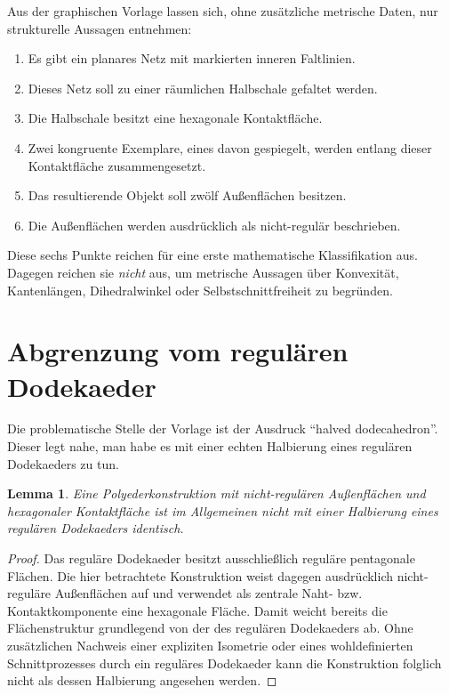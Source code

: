 \documentclass[11pt]{article}
\theoremstyle{plain}
\newtheorem{lemma}[satz]{Lemma}
\theoremstyle{definition}
\theoremstyle{remark}
\begin{document}
	Aus der graphischen Vorlage lassen sich, ohne zusätzliche metrische Daten, nur strukturelle Aussagen entnehmen:
	\begin{enumerate}[label=(\roman*)]
		\item Es gibt ein planares Netz mit markierten inneren Faltlinien.
		\item Dieses Netz soll zu einer räumlichen Halbschale gefaltet werden.
		\item Die Halbschale besitzt eine hexagonale Kontaktfläche.
		\item Zwei kongruente Exemplare, eines davon gespiegelt, werden entlang dieser Kontaktfläche zusammengesetzt.
		\item Das resultierende Objekt soll zwölf Außenflächen besitzen.
		\item Die Außenflächen werden ausdrücklich als nicht-regulär beschrieben.
	\end{enumerate}
	
	Diese sechs Punkte reichen für eine erste mathematische Klassifikation aus. Dagegen reichen sie \emph{nicht} aus, um metrische Aussagen über Konvexität, Kantenlängen, Dihedralwinkel oder Selbstschnittfreiheit zu begründen.
	
	\section{Abgrenzung vom regulären Dodekaeder}
	
	Die problematische Stelle der Vorlage ist der Ausdruck \enquote{halved dodecahedron}. Dieser legt nahe, man habe es mit einer echten Halbierung eines regulären Dodekaeders zu tun.
	
	\begin{lemma}\label{lem:nicht-halbdodekaeder}
		Eine Polyederkonstruktion mit nicht-regulären Außenflächen und hexagonaler Kontaktfläche ist im Allgemeinen nicht mit einer Halbierung eines regulären Dodekaeders identisch.
	\end{lemma}
	
	\begin{proof}
		Das reguläre Dodekaeder besitzt ausschließlich reguläre pentagonale Flächen. Die hier betrachtete Konstruktion weist dagegen ausdrücklich nicht-reguläre Außenflächen auf und verwendet als zentrale Naht- bzw. Kontaktkomponente eine hexagonale Fläche. Damit weicht bereits die Flächenstruktur grundlegend von der des regulären Dodekaeders ab. Ohne zusätzlichen Nachweis einer expliziten Isometrie oder eines wohldefinierten Schnittprozesses durch ein reguläres Dodekaeder kann die Konstruktion folglich nicht als dessen Halbierung angesehen werden.
	\end{proof}
	
\end{document}
